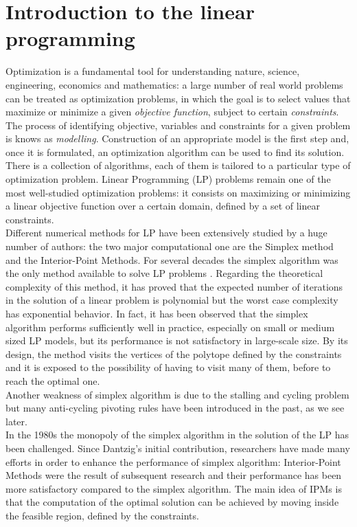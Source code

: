 \documentclass[a4paper,10 pt,titlepage,twoside]{report}
\theoremstyle{plain}
\theoremstyle{definition}
\theoremstyle{remark}
\begin{document}
\chapter{Introduction to the linear programming}
Optimization is a fundamental tool for understanding nature, science, engineering, economics and mathematics: a large number of real world problems can be treated as optimization problems, in which the goal is to select values that maximize or minimize a given \textit{objective function}, subject to certain \textit{constraints}.\\ The process of identifying objective, variables and constraints for a given problem is knows as \textit{modelling}. Construction of an appropriate model is the first step and, once it is formulated, an optimization algorithm can be used to find its solution.\\ There is a collection of algorithms, each of them is tailored to a particular type of optimization problem. Linear Programming (LP) problems remain one of the most well-studied optimization problems: it consists on maximizing or minimizing a linear objective function over a certain domain, defined by a set of linear constraints.\\
Different numerical methods for LP have been extensively studied by a huge number of authors: the two major computational one are the Simplex method and the Interior-Point Methods.
For several decades the simplex algorithm was the only method available to solve LP problems \cite{1}. Regarding the theoretical complexity of this method, it has proved that the expected number of iterations in the solution of a linear problem is polynomial but the worst case complexity has exponential behavior. In fact, it has been observed that the simplex algorithm performs sufficiently well in practice, especially on small or medium sized LP models, but its performance is not satisfactory in large-scale size. By its design, the method visits the vertices of the polytope defined by the constraints and it is exposed to the possibility of having to visit many of them, before to reach the optimal one.\\ Another weakness of simplex algorithm is due to the stalling and cycling problem but many anti-cycling pivoting rules have been introduced in the past, as we see later.\\
In the 1980s the monopoly of the simplex algorithm in the solution of the LP has been challenged. Since Dantzig's initial contribution, researchers have made many efforts in order to enhance the performance of simplex algorithm: Interior-Point Methods were the result of subsequent research and their performance has been more satisfactory compared to the simplex algorithm. The main idea of IPMs is that the computation of the optimal solution can be achieved by moving inside the feasible region, defined by the constraints.\\
\end{document}
